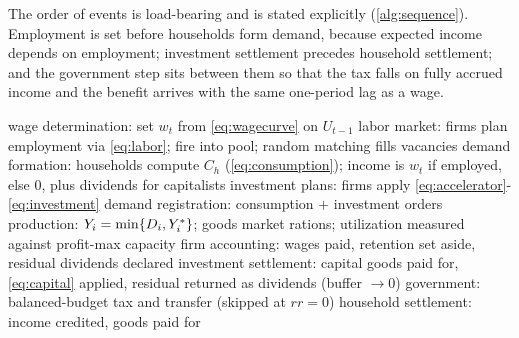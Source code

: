 The order of events is load-bearing and is stated explicitly
(\cref{alg:sequence}). Employment is set before households form demand,
because expected income depends on employment; investment settlement precedes
household settlement; and the government step sits between them so that the
tax falls on fully accrued income and the benefit arrives with the same
one-period lag as a wage.

\begin{algorithm}[H]
\caption{One period of the model}
\label{alg:sequence}
\begin{algorithmic}[1]
\State wage determination: set $w_t$ from \cref{eq:wagecurve} on
       $U_{t-1}$
\State labor market: firms plan employment via \cref{eq:labor};
       fire into pool; random matching fills vacancies
\State demand formation: households compute $C_h$
       (\cref{eq:consumption}); income is $w_t$ if employed, else $0$, plus
       dividends for capitalists
\State investment plans: firms apply \cref{eq:accelerator}-%
       \cref{eq:investment}
\State demand registration: consumption $+$ investment orders
\State production: $Y_i = \min\{D_i, Y^{\ast}_i\}$; goods market
       rations; utilization measured against profit-max capacity
\State firm accounting: wages paid, retention set aside, residual
       dividends declared
\State investment settlement: capital goods paid for,
       \cref{eq:capital} applied, residual returned as dividends
       (buffer $\to 0$)
\State government: balanced-budget tax and transfer (skipped at
       $rr = 0$)
\State household settlement: income credited, goods paid for
\end{algorithmic}
\end{algorithm}
